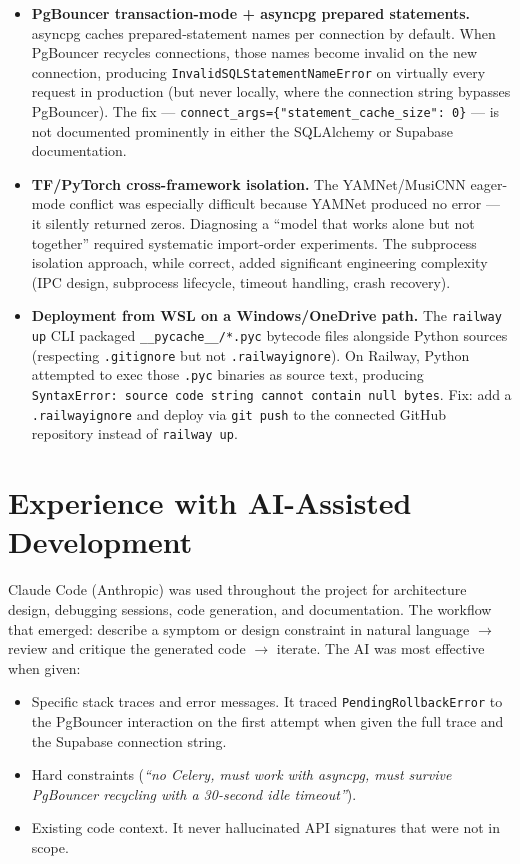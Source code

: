 \documentclass[12pt,letterpaper]{report}
\begin{document}
\begin{itemize}
  \item \textbf{PgBouncer transaction-mode + asyncpg prepared statements.} asyncpg caches prepared-statement names per connection by default. When PgBouncer recycles connections, those names become invalid on the new connection, producing \texttt{InvalidSQLStatementNameError} on virtually every request in production (but never locally, where the connection string bypasses PgBouncer). The fix --- \texttt{connect\_args=\{"statement\_cache\_size": 0\}} --- is not documented prominently in either the SQLAlchemy or Supabase documentation.
  \item \textbf{TF/PyTorch cross-framework isolation.} The YAMNet/MusiCNN eager-mode conflict was especially difficult because YAMNet produced no error --- it silently returned zeros. Diagnosing a ``model that works alone but not together'' required systematic import-order experiments. The subprocess isolation approach, while correct, added significant engineering complexity (IPC design, subprocess lifecycle, timeout handling, crash recovery).
  \item \textbf{Deployment from WSL on a Windows/OneDrive path.} The \texttt{railway up} CLI packaged \texttt{\_\_pycache\_\_/*.pyc} bytecode files alongside Python sources (respecting \texttt{.gitignore} but not \texttt{.railwayignore}). On Railway, Python attempted to exec those \texttt{.pyc} binaries as source text, producing \texttt{SyntaxError: source code string cannot contain null bytes}. Fix: add a \texttt{.railwayignore} and deploy via \texttt{git push} to the connected GitHub repository instead of \texttt{railway up}.
\end{itemize}

\section{Experience with AI-Assisted Development}

Claude Code (Anthropic) was used throughout the project for architecture design, debugging sessions, code generation, and documentation. The workflow that emerged: describe a symptom or design constraint in natural language $\to$ review and critique the generated code $\to$ iterate. The AI was most effective when given:

\begin{itemize}
  \item Specific stack traces and error messages. It traced \texttt{PendingRollbackError} to the PgBouncer interaction on the first attempt when given the full trace and the Supabase connection string.
  \item Hard constraints (\textit{``no Celery, must work with asyncpg, must survive PgBouncer recycling with a 30-second idle timeout''}).
  \item Existing code context. It never hallucinated API signatures that were not in scope.
\end{itemize}
\end{document}
